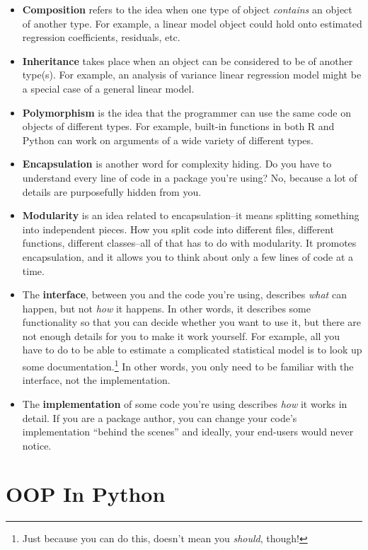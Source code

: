 \documentclass[
  12pt,
]{krantz}
\begin{document}
\begin{itemize}
\item
  \textbf{Composition} refers to the idea when one type of object \emph{contains} an object of another type. For example, a linear model object could hold onto estimated regression coefficients, residuals, etc.
\item
  \textbf{Inheritance} takes place when an object can be considered to be of another type(s). For example, an analysis of variance linear regression model might be a special case of a general linear model.
\item
  \textbf{Polymorphism} is the idea that the programmer can use the same code on objects of different types. For example, built-in functions in both R and Python can work on arguments of a wide variety of different types.
\item
  \textbf{Encapsulation} is another word for complexity hiding. Do you have to understand every line of code in a package you're using? No, because a lot of details are purposefully hidden from you.
\item
  \textbf{Modularity} is an idea related to encapsulation--it means splitting something into independent pieces. How you split code into different files, different functions, different classes--all of that has to do with modularity. It promotes encapsulation, and it allows you to think about only a few lines of code at a time.
\item
  The \textbf{interface}, between you and the code you're using, describes \emph{what} can happen, but not \emph{how} it happens. In other words, it describes some functionality so that you can decide whether you want to use it, but there are not enough details for you to make it work yourself. For example, all you have to do to be able to estimate a complicated statistical model is to look up some documentation.\footnote{Just because you can do this, doesn't mean you \emph{should}, though!} In other words, you only need to be familiar with the interface, not the implementation.
\item
  The \textbf{implementation} of some code you're using describes \emph{how} it works in detail. If you are a package author, you can change your code's implementation ``behind the scenes'' and ideally, your end-users would never notice.
\end{itemize}

\hypertarget{oop-in-python}{%
\section{OOP In Python}\label{oop-in-python}}
\end{document}
